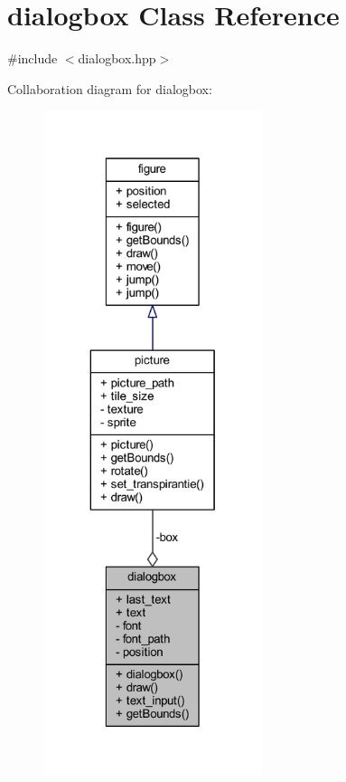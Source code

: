 \hypertarget{classdialogbox}{}\section{dialogbox Class Reference}
\label{classdialogbox}


{\ttfamily \#include $<$dialogbox.\+hpp$>$}



Collaboration diagram for dialogbox\+:
\nopagebreak
\begin{figure}[H]
\begin{center}
\leavevmode
\includegraphics[height=550pt]{classdialogbox__coll__graph}
\end{center}
\end{figure}
